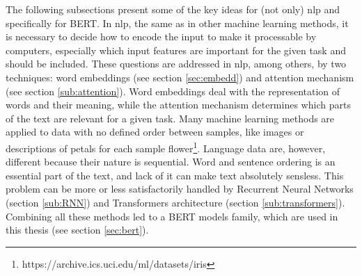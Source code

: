 The following subsections present some of the key ideas for (not only) \acrshort{nlp} and specifically for BERT. In \acrshort{nlp}, the same as in other machine learning methods, it is necessary to decide how to encode the input to make it processable by computers, especially which input features are important for the given task and should be included. These questions are addressed in \acrshort{nlp}, among others, by two techniques: word embeddings (see section \ref{sec:embedd}) and attention mechanism (see section \ref{sub:attention}). Word embeddings deal with the representation of words and their meaning, while the attention mechanism determines which parts of the text are relevant for a given task. Many machine learning methods are applied to data with no defined order between samples, like images or descriptions of petals for each sample flower\footnote{https://archive.ics.uci.edu/ml/datasets/iris}.
Language data are, however, different because their nature is sequential. Word and sentence ordering is an essential part of the text, and lack of it can make text absolutely sensless. This problem can be more or less satisfactorily handled by Recurrent Neural Networks (section \ref{sub:RNN}) and Transformers architecture (section \ref{sub:transformers}). Combining all these methods led to a BERT models family, which are used in this thesis (see section \ref{sec:bert}).

